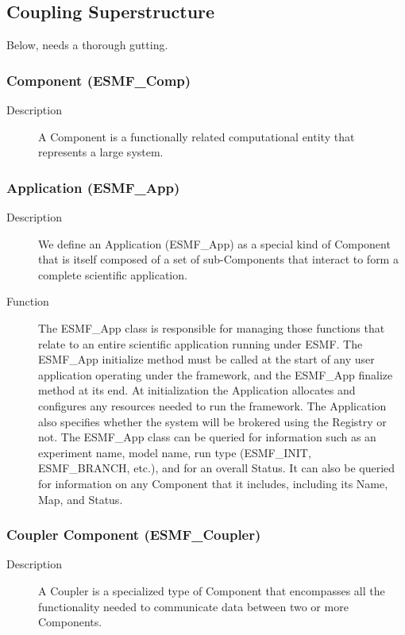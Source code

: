\subsection{Coupling Superstructure}

Below, needs a thorough gutting.

\subsubsection{Component (ESMF\_Comp)} 
\begin{description}
\item [Description] A Component is a functionally related computational entity that represents 
a large system.  
\end{description}

\subsubsection{Application (ESMF\_App)}
\begin{description} 
\item [Description] We define an Application (ESMF\_App) as a special kind of Component 
that is itself composed of a set of sub-Components that interact to form a complete scientific
application.  
\item [Function] The ESMF\_App class is responsible for managing those functions that relate 
to an entire scientific application running under ESMF.  The ESMF\_App initialize method 
must be called at the start of any user application operating under the framework, and
the ESMF\_App finalize method at its end.  At initialization the Application allocates and 
configures any resources needed to run the framework.  The Application also specifies whether 
the system will be brokered using the Registry or not.  The ESMF\_App class can be queried 
for information such as an experiment name, model name, run type (ESMF\_INIT, 
ESMF\_BRANCH, etc.), and for an overall Status.  It can also be queried for
information on any Component that it includes, including its Name, Map, and
Status.
\end{description}

\subsubsection{Coupler Component (ESMF\_Coupler)}
\begin{description}
\item [Description] A Coupler is a specialized type of Component that encompasses all the 
functionality needed to communicate
data between two or more Components. 
\end{description}


